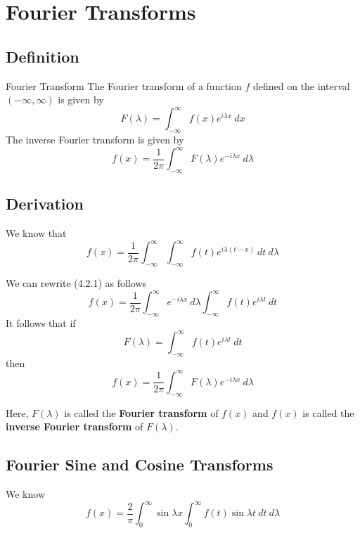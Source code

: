 \documentclass[12pt]{article}
\numberwithin{equation}{subsection}
\begin{document}

\section{Fourier Transforms}

\subsection{Definition}
\begin{definition}{Fourier Transform}{}
    The Fourier transform of a function $f$ defined on the interval $(-\infty,\infty)$ is given by
    \begin{equation}
        F(\lambda) = \int_{-\infty}^{\infty} {f(x) e^{i\lambda x}} \: d{x}
    \end{equation}
    The inverse Fourier transform is given by
    \begin{equation}
        f(x) = \frac{1}{2\pi} \int_{-\infty}^{\infty} {F(\lambda) e^{-i\lambda x}} \: d{\lambda}
    \end{equation}
\end{definition}

\subsection{Derivation}
We know that
\begin{equation}
    f(x) = \frac{1}{2\pi} \int_{-\infty}^{\infty} { \int_{-\infty}^{\infty} { f(t) e^{i\lambda(t-x)} } \: d{t} } \: d{\lambda}
\end{equation}

We can rewrite (4.2.1) as follows \[
    f(x) = \frac{1}{2\pi} \int_{-\infty}^{\infty} {e^{-i\lambda x}} \: d{\lambda} \int_{-\infty}^{\infty} {f(t) e^{i\lambda t}} \: d{t}
\]
It follows that if
\begin{equation}
    \boxed{ F(\lambda) = \int_{-\infty}^{\infty} {f(t) e^{i\lambda t}} \: d{t} }
\end{equation}
then
\begin{equation}
    \boxed{ f(x) = \frac{1}{2\pi} \int_{-\infty}^{\infty} { F(\lambda) e^{-i\lambda x} } \: d{\lambda} }
\end{equation}

Here, $F(\lambda)$ is called the \textbf{Fourier transform} of $f(x)$ and $f(x)$ is called the \textbf{inverse Fourier transform} of $F(\lambda)$.

\subsection{Fourier Sine and Cosine Transforms}
We know
\begin{equation}
    f(x) = \frac{2}{\pi} \int_{0}^{\infty} { \sin{\lambda x} \int_{0}^{\infty} { f(t) \sin{\lambda t} } \: d{t} } \: d{\lambda}
\end{equation}
\end{document}
